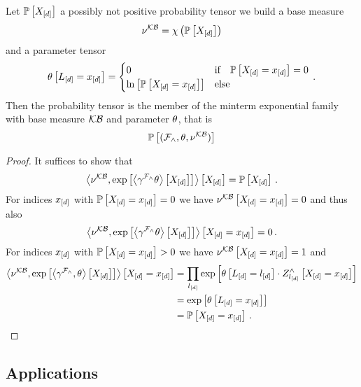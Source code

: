 \begin{theorem}\label{the:mintermExpressivityHLN}
	Let $\mathbb{P}\left[X_{[d]}\right]$ a possibly not positive probability tensor we build a base measure
		\[ \nu^{\mathcal{KB}} = \chi\left(\mathbb{P}\left[X_{[d]}\right]\right) \]
	and a parameter tensor
	\begin{align*}
		\theta\left[L_{[d]}=x_{[d]}\right]
		= \begin{cases}
			0 & \text{if} \quad \mathbb{P}\left[X_{[d]}=x_{[d]}\right] = 0  \\
			\ln \left[ \mathbb{P}\left[X_{[d]}=x_{[d]}\right] \right] & \text{else} 
		\end{cases} \, . 
	\end{align*}
	Then the probability tensor is the member of the minterm exponential family with base measure $\mathcal{KB}$ and parameter $\theta$, that is
		\[ \mathbb{P}\left[(\mathcal{F}_{\land},\theta,\nu^{\mathcal{KB}})\right]\]
\end{theorem}
\begin{proof}
	It suffices to show that 
		\[ \left\langle \nu^{\mathcal{KB}}, \mathrm{exp}\left[\left\langle 
		\gamma^{\mathcal{F}_{\land}}\theta
		\right\rangle \left[ 
		X_{[d]}
		 \right]\right]\right\rangle \left[ X_{[d]} \right] = \mathbb{P}\left[X_{[d]}\right] \, . \]
	For indices $x_{[d]}$ with $\mathbb{P}\left[X_{[d]}=x_{[d]}\right]=0$ we have $\nu^{\mathcal{KB}}\left[X_{[d]}=x_{[d]}\right]=0$ and thus also 
		\[ \left\langle \nu^{\mathcal{KB}}, \mathrm{exp}\left[\left\langle 
		\gamma^{\mathcal{F}_{\land}}\theta
		\right\rangle \left[ 
		X_{[d]}
		 \right]\right]\right\rangle \left[ X_{[d]}=x_{[d]} \right] = 0 \, . \]
	For indices $x_{[d]}$ with $\mathbb{P}\left[X_{[d]}=x_{[d]}\right]>0$ we have $\nu^{\mathcal{KB}}\left[X_{[d]}=x_{[d]}\right]=1$ and
	\begin{align*}
		 \left\langle \nu^{\mathcal{KB}}, \mathrm{exp}\left[\left\langle 
		\gamma^{\mathcal{F}_{\land}},\theta
		\right\rangle \left[ 
		X_{[d]}
		 \right]\right]\right\rangle \left[ X_{[d]}=x_{[d]} \right] 
		&= \prod_{l_{[d]}} \mathrm{exp}\left[\theta\left[L_{[d]}=l_{[d]}\right] \cdot Z^{\land}_{l_{[d]}}\left[X_{[d]}=x_{[d]}\right]\right] \\
		&=  \mathrm{exp}\left[\theta\left[L_{[d]}=x_{[d]}\right]\right] \\
		&=  \mathbb{P}\left[X_{[d]}=x_{[d]}\right] \, .
	\end{align*}
\end{proof}

\subsection{Applications}

